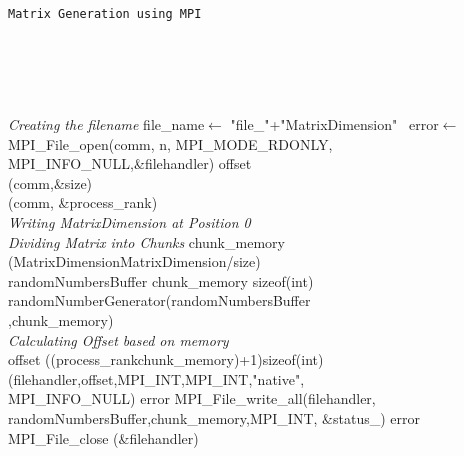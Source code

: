 \documentclass[11pt,conference]{IEEEtran}
\begin{document}
\linesnumbered
\begin{algorithm}[h!]

\centring





\caption{\texttt{Matrix Generation using MPI}}
\vspace{0.5cm}

\mpiFileO\\
\mpiStatus\\
\mpiComm\\
\mpiI\\


     {
     \emph{Creating the filename}
     file\_name$\leftarrow$ "file\_"+"MatrixDimension"
     \ error$\leftarrow$MPI\_File\_open(comm, n, MPI\_MODE\_RDONLY, MPI\_INFO\_NULL,\&filehandler)
     \mpiOff offset  \\
     \cs(comm,\&size)\\
     \crr (comm, \&process\_rank)\\
     \emph{Writing MatrixDimension at Position 0} \\
         \emph{Dividing Matrix into Chunks}
    \mpiOff chunk\_memory \leftarrow (MatrixDimension\times MatrixDimension/size)\\
    randomNumbersBuffer \leftarrow chunk\_memory \times sizeof(int)\\
    randomNumberGenerator(randomNumbersBuffer\\,chunk\_memory)\\
    \emph{Calculating Offset based on memory}\\
    offset \leftarrow ((process\_rank\times chunk\_memory)+1)\times sizeof(int)\\
    \setV (filehandler,offset,MPI_INT,MPI_INT,"native",\\ MPI\_INFO\_NULL)
    error \leftarrow MPI\_File\_write\_all(filehandler,\\randomNumbersBuffer,chunk\_memory,MPI\_INT, \&status_)
    error \leftarrow MPI\_File\_close (\&filehandler)\\
     }
\finalize
\label{ii}
\end{algorithm}
\end{document}
